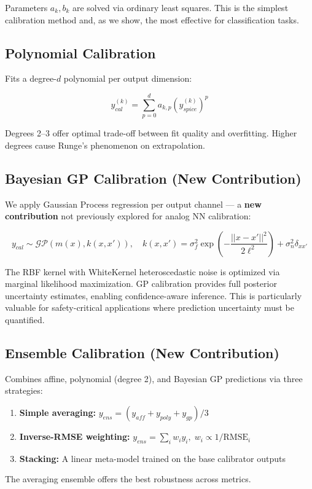 \documentclass[10pt,twocolumn]{article}
\begin{document}
Parameters $a_k, b_k$ are solved via ordinary least squares. This is the simplest calibration method and, as we show, the most effective for classification tasks.

\subsection{Polynomial Calibration}

Fits a degree-$d$ polynomial per output dimension:

\begin{equation}
y_{cal}^{(k)} = \sum_{p=0}^d a_{k,p} \left(y_{spice}^{(k)}\right)^p
\end{equation}

Degrees 2--3 offer optimal trade-off between fit quality and overfitting. Higher degrees cause Runge's phenomenon on extrapolation.

\subsection{Bayesian GP Calibration (New Contribution)}

We apply Gaussian Process regression per output channel --- a \textbf{new contribution} not previously explored for analog NN calibration:

\begin{equation}
y_{cal} \sim \mathcal{GP}(m(x), k(x, x')), \quad k(x,x') = \sigma_f^2 \exp\left(-\frac{||x-x'||^2}{2\ell^2}\right) + \sigma_n^2 \delta_{xx'}
\end{equation}

The RBF kernel with WhiteKernel heteroscedastic noise is optimized via marginal likelihood maximization. GP calibration provides full posterior uncertainty estimates, enabling confidence-aware inference. This is particularly valuable for safety-critical applications where prediction uncertainty must be quantified.

\subsection{Ensemble Calibration (New Contribution)}

Combines affine, polynomial (degree 2), and Bayesian GP predictions via three strategies:
\begin{enumerate}
  \item \textbf{Simple averaging:} $y_{ens} = (y_{aff} + y_{poly} + y_{gp}) / 3$
  \item \textbf{Inverse-RMSE weighting:} $y_{ens} = \sum_i w_i y_i, \; w_i \propto 1/\text{RMSE}_i$
  \item \textbf{Stacking:} A linear meta-model trained on the base calibrator outputs
\end{enumerate}
The averaging ensemble offers the best robustness across metrics.
\end{document}
